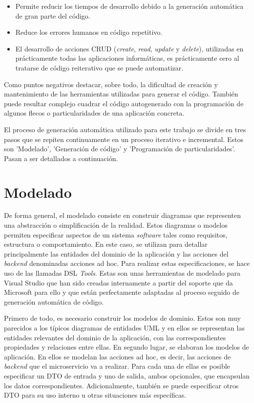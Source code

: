\documentclass[11pt,spanish,listoffigures]{tfgetsinf}
\begin{document}
\begin{itemize}

	\item Permite reducir los tiempos de desarrollo debido a la generación automática de gran parte del código.

	\item Reduce los errores humanos en código repetitivo.

	\item El desarrollo de acciones CRUD (\emph{create}, \emph{read}, \emph{update} y \emph{delete}), utilizadas en prácticamente todas las aplicaciones informáticas, es prácticamente cero al tratarse de código reiterativo que se puede automatizar.

\end{itemize}

Como puntos negativos destacar, sobre todo, la dificultad de creación y mantenimiento de las herramientas utilizadas para generar el código. También puede resultar complejo cuadrar el código autogenerado con la programación de algunos flecos o particularidades de una aplicación concreta.

El proceso de generación automática utilizado para este trabajo se divide en tres pasos que se repiten continuamente en un proceso iterativo e incremental. Estos son 'Modelado', 'Generación de código' y 'Programación de particularidades'. Pasan a ser detallados a continuación.

	\section{Modelado}

De forma general, el modelado consiste en construir diagramas que representen una abstracción o simplificación de la realidad. Estos diagramas o modelos permiten especificar aspectos de un sistema \emph{software} tales como requisitos, estructura o comportamiento. En este caso, se utilizan para detallar principalmente las entidades del dominio de la aplicación y las acciones del \emph{backend} denominadas acciones ad hoc. Para realizar estas especificaciones, se hace uso de las llamadas DSL \emph{Tools}. Estas son unas herramientas de modelado para Visual Studio que han sido creadas internamente a partir del soporte que da Microsoft para ello \cite{DSL} y que están perfectamente adaptadas al proceso seguido de generación automática de código.

Primero de todo, es necesario construir los modelos de dominio. Estos son muy parecidos a los típicos diagramas de entidades UML y en ellos se representan las entidades relevantes del dominio de la aplicación, con las correspondientes propiedades y relaciones entre ellas. En segundo lugar, se elaboran los modelos de aplicación. En ellos se modelan las acciones ad hoc, es decir, las acciones de \emph{backend} que el microservicio va a realizar. Para cada una de ellas es posible especificar un DTO de entrada y uno de salida, ambos opcionales, que encapsulan los datos correspondientes. Adicionalmente, también se puede especificar otros DTO para su uso interno u otras situaciones más específicas.
\end{document}

